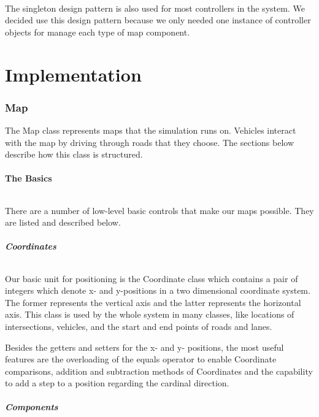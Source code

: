 \documentclass[a4paper,11pt,titlepage]{article}
\begin{document}
\paragraph{}
The singleton design pattern is also used for most controllers in the system. We decided use this design pattern because we only needed one instance of controller objects for manage each type of map component.

\part{Implementation}
\section{Map}
The Map class represents maps that the simulation runs on. Vehicles interact with the map by driving through roads that they choose. The sections below describe how this class is structured.
\subsection{The Basics}
\paragraph{}
There are a number of low-level basic controls that make our maps possible. They are listed and described below.
\subsubsection{Coordinates}
\paragraph{}
Our basic unit for positioning is the Coordinate class which contains a pair of integers which denote  x- and y-positions in a two dimensional coordinate system. The former represents the vertical axis and the latter represents the horizontal axis. This class is used by the whole system in many classes, like locations of intersections, vehicles, and the start and end points of roads and lanes.

Besides the getters and setters for the x- and y- positions, the most useful features are the overloading of the equals operator to enable Coordinate comparisons, addition and subtraction methods of Coordinates and the capability to add a step to a position regarding the cardinal direction.
\subsubsection{Components}
\end{document}
